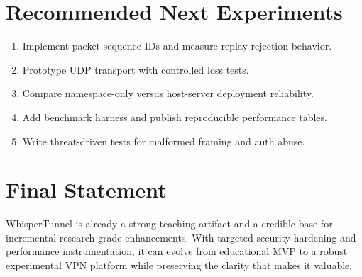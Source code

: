 \section{Recommended Next Experiments}
\begin{enumerate}[leftmargin=2em]
\item Implement packet sequence IDs and measure replay rejection behavior.
\item Prototype UDP transport with controlled loss tests.
\item Compare namespace-only versus host-server deployment reliability.
\item Add benchmark harness and publish reproducible performance tables.
\item Write threat-driven tests for malformed framing and auth abuse.
\end{enumerate}

\section{Final Statement}
WhisperTunnel is already a strong teaching artifact and a credible base for incremental research-grade enhancements. With targeted security hardening and performance instrumentation, it can evolve from educational MVP to a robust experimental VPN platform while preserving the clarity that makes it valuable.
